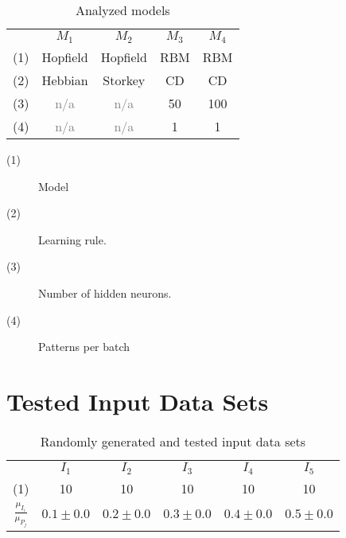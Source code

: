 \documentclass[12pt]{article}
\begin{document}
\begin{appendices}
        \begin{table}[H]
        \centering
        \def\arraystretch{1.5}
        \begin{tabular}{ccccc}
        
 & $M_{1}$  & $M_{2}$  & $M_{3}$  & $M_{4}$  \\ \cline{2-5}
(1)  & Hopfield  & Hopfield  & RBM  & RBM \\
(2)  & Hebbian  & Storkey  & CD  & CD \\
(3)  & \textcolor{gray}{n/a}  & \textcolor{gray}{n/a}  & 50  & 100 \\
(4)  & \textcolor{gray}{n/a}  & \textcolor{gray}{n/a}  & 1  & 1 
        \end{tabular}
        \caption{Analyzed models}
        \end{table}
        

        \begin{description}
        \item [(1)] Model
\item [(2)] Learning rule.
\item [(3)] Number of hidden neurons.
\item [(4)] Patterns per batch
        \end {description}
        
\section{Tested Input Data Sets}

    

        \begin{table}[H]
        \centering
        \def\arraystretch{1.5}
        \begin{tabular}{cccccc}
        
 & $I_{1}$  & $I_{2}$  & $I_{3}$  & $I_{4}$  & $I_{5}$  \\ \cline{2-6}
(1)  & 10  & 10  & 10  & 10  & 10 \\
$\frac{\mu_{I_i}}{\mu_{P_j}}$  & $0.1\pm0.0$  & $0.2\pm0.0$  & $0.3\pm0.0$  & $0.4\pm0.0$  & $0.5\pm0.0$ 
        \end{tabular}
        \caption{Randomly generated and tested input data sets}
        \end{table}
        


\end{appendices}
\end{document}
